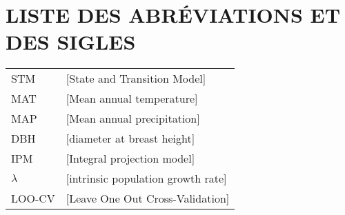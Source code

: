 \chapter*{LISTE DES ABRÉVIATIONS ET DES SIGLES}

\begin{tabular}{ ll } 
STM & [State and Transition Model] \\ 
MAT & [Mean annual temperature] \\ 
MAP & [Mean annual precipitation] \\ 
DBH & [diameter at breast height] \\
IPM & [Integral projection model] \\ 
\(\lambda\) & [intrinsic population growth rate] \\
LOO-CV & [Leave One Out Cross-Validation] \\

 \end{tabular}


